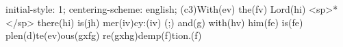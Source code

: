 initial-style: 1;
centering-scheme: english;
(c3)With(ev) the(fv) Lord(hi) <sp>*</sp> there(hi) is(jh) mer(iv)cy:(iv) (;) and(g) with(hv) him(fe) is(fe) plen(d)te(ev)ous(gxfg) re(gxhg)demp(f)tion.(f)